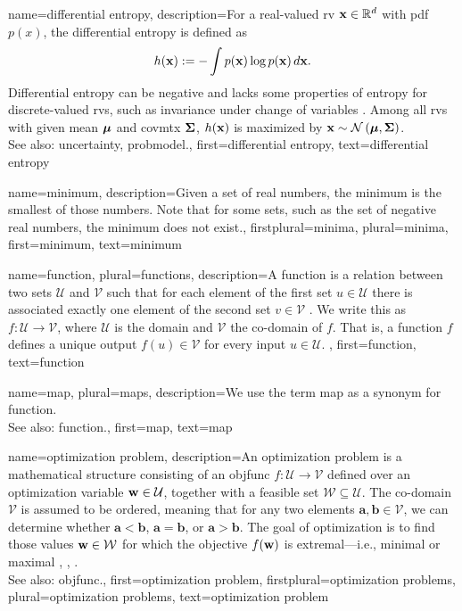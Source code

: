 {name={differential entropy},
	description={For a real-valued \gls{rv} ${\bf x} \in \mathbb{R}^{d}$ 
		with \gls{pdf} $p(x)$,
		the differential entropy is defined as \cite{coverthomas}
		\[
		h({\bf x}) := - \int p({\bf x}) \log p({\bf x}) \, d{\bf x}.
		\]
		Differential entropy can be negative and lacks some properties of \gls{entropy} for 
		discrete-valued \glspl{rv}, such as invariance under change of variables \cite{coverthomas}. 
		Among all \glspl{rv} with given \gls{mean} ${\bm \mu}$ and \gls{covmtx} ${\bf \Sigma}$, 
		$h({\bf x})$ is maximized by ${\bf x} \sim \mathcal{N}\left({\bm \mu},{\bf \Sigma}\right)$. 
		\\
		See also: \gls{uncertainty}, \gls{probmodel}.},
	first={differential entropy},
	text={differential entropy}
}


{name={minimum},
	description={Given a set of real numbers, the minimum is the smallest of those numbers.
		Note that for some sets, such as the set of negative real numbers, the minimum does not exist.},
	firstplural={minima}, 
 	plural={minima},
	first={minimum},
	text={minimum}
}

{name={function}, plural={functions}, 
	description={A function is a relation between two sets $\mathcal{U}$ and $\mathcal{V}$ such that for each  
	element of the first set $u \in \mathcal{U}$ there is associated exactly one element of the second set $v \in \mathcal{V}$ 
	\cite{RudinBookPrinciplesMatheAnalysis}. 
		  We write this as $f: \mathcal{U} \rightarrow \mathcal{V}$, where $\mathcal{U}$ is the domain 
		  and $\mathcal{V}$ the co-domain of $f$. That is, a function $f$ defines a unique 
		  output $f(u) \in \mathcal{V}$ for every input $u \in \mathcal{U}$. 
	},
	first={function},
	text={function}
}


{name={map}, plural={maps}, 
	description={We use the term map as a synonym for \gls{function}.
	\\
	See also: \gls{function}.},
	first={map},
	text={map}
}


{name={optimization problem}, 
	description={An optimization problem is a mathematical 
		   structure consisting of an \gls{objfunc} $f: \mathcal{U} \rightarrow \mathcal{V}$ 
		   defined over an optimization variable ${\bf w} \in \mathcal{U}$, together with a 
		   feasible set $\mathcal{W} \subseteq \mathcal{U}$. The co-domain $\mathcal{V}$ is 
		   assumed to be ordered, meaning that for any two elements $\mathbf{a}, \mathbf{b} \in \mathcal{V}$, 
		   we can determine whether $\mathbf{a} < \mathbf{b}$, $\mathbf{a} = \mathbf{b}$, 
		   or $\mathbf{a} > \mathbf{b}$. The goal of optimization is to find those values ${\bf w} \in \mathcal{W}$ 
		   for which the objective $f({\bf w})$ is extremal—i.e., minimal or maximal \cite{BoydConvexBook}, \cite{BertsekasNonLinProgr}, \cite{nesterov04}.
		   \\
		   See also: \gls{objfunc}.},
	first={optimization problem},
	firstplural={optimization problems}, 
	plural={optimization problems}, 
	text={optimization problem}
}

